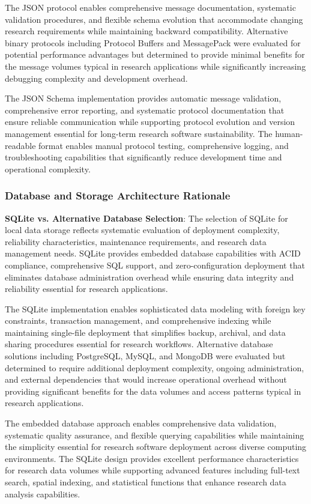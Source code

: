 \documentclass[11pt,a4paper]{article}
\begin{document}
The JSON protocol enables comprehensive message documentation, systematic validation procedures, and flexible schema
evolution that accommodate changing research requirements while maintaining backward compatibility. Alternative binary
protocols including Protocol Buffers and MessagePack were evaluated for potential performance advantages but determined
to provide minimal benefits for the message volumes typical in research applications while significantly increasing
debugging complexity and development overhead.

The JSON Schema implementation provides automatic message validation, comprehensive error reporting, and systematic
protocol documentation that ensure reliable communication while supporting protocol evolution and version management
essential for long-term research software sustainability. The human-readable format enables manual protocol testing,
comprehensive logging, and troubleshooting capabilities that significantly reduce development time and operational
complexity.

\subsubsection{Database and Storage Architecture Rationale}

\textbf{SQLite vs. Alternative Database Selection}: The selection of SQLite for local data storage reflects systematic
evaluation of deployment complexity, reliability characteristics, maintenance requirements, and research data management
needs. SQLite provides embedded database capabilities with ACID compliance, comprehensive SQL support, and
zero-configuration deployment that eliminates database administration overhead while ensuring data integrity and
reliability essential for research applications.

The SQLite implementation enables sophisticated data modeling with foreign key constraints, transaction management, and
comprehensive indexing while maintaining single-file deployment that simplifies backup, archival, and data sharing
procedures essential for research workflows. Alternative database solutions including PostgreSQL, MySQL, and MongoDB
were evaluated but determined to require additional deployment complexity, ongoing administration, and external
dependencies that would increase operational overhead without providing significant benefits for the data volumes and
access patterns typical in research applications.

The embedded database approach enables comprehensive data validation, systematic quality assurance, and flexible
querying capabilities while maintaining the simplicity essential for research software deployment across diverse
computing environments. The SQLite design provides excellent performance characteristics for research data volumes while
supporting advanced features including full-text search, spatial indexing, and statistical functions that enhance
research data analysis capabilities.
\end{document}
